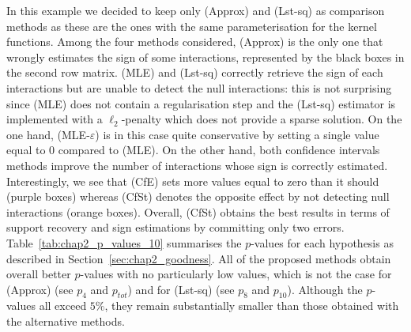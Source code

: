     In this example we decided to keep only (Approx) and (Lst-sq) as comparison methods as these are the ones with the same parameterisation for the kernel functions.
    Among the four methods considered, (Approx) is the only one that wrongly estimates the sign of some interactions, represented by the black boxes in the second row matrix. (MLE) and (Lst-sq) correctly retrieve the sign of each interactions but are unable to detect the null interactions: this is not surprising since (MLE) does not contain a regularisation step and the (Lst-sq) estimator is implemented with a $\ell_2$-penalty which does not provide a sparse solution.
    On the one hand, (MLE-$\varepsilon$) is in this case quite conservative by setting a single value equal to 0 compared to (MLE).
    On the other hand, both confidence intervals methods improve the number of interactions whose sign is correctly estimated. Interestingly, we see that (CfE) sets more values equal to zero than it should (purple boxes) whereas (CfSt) denotes the opposite effect by not detecting null interactions (orange boxes). Overall, (CfSt) obtains the best results in terms of support recovery and sign estimations by committing only two errors. Table~\ref{tab:chap2_p_values_10} summarises the $p$-values for each hypothesis as described in Section~\ref{sec:chap2_goodness}. 
    All of the proposed methods obtain overall better $p$-values with no particularly low values, which is not the case for (Approx) (see $p_4$ and $p_{tot}$) and for (Lst-sq) (see $p_8$ and $p_{10}$). Although the $p$-values all exceed $5\%$, they remain substantially smaller than those obtained with the alternative methods.  
    
